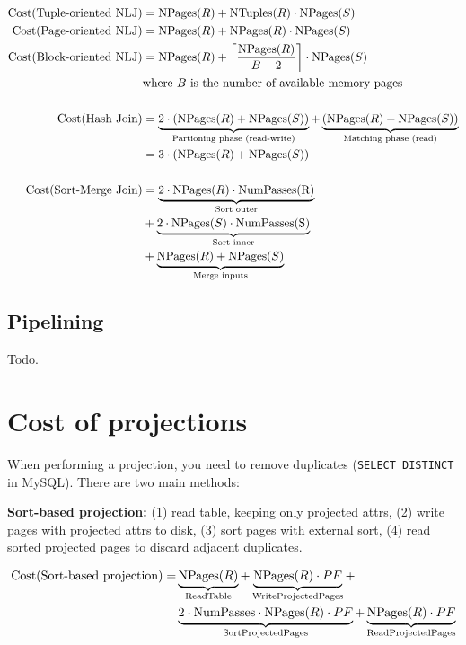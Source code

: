 \documentclass[10pt]{article}
\newcommand{\NPages}{\mathrm{NPages}}
\newcommand{\NTuples}{\mathrm{NTuples}}
\DeclarePairedDelimiter{\ceil}{\lceil}{\rceil}
\begin{document}
\begin{bluebox}
\begin{align*}
    \text{Cost(Tuple-oriented NLJ)} &= \NPages(R) + \NTuples(R) \cdot \NPages(S) \\
    \text{Cost(Page-oriented NLJ)} &= \NPages(R) + \NPages(R) \cdot \NPages(S) \\
    \text{Cost(Block-oriented NLJ)} &= \NPages(R) + \ceil*{\frac{\NPages(R)}{B - 2}} \cdot \NPages(S) \\
        &\text{where $B$ is the number of available memory pages} \\
        \; \\
    \text{Cost(Hash Join)} &= \underbrace{2 \cdot (\NPages(R) + \NPages(S))}_{\tiny \text{Partioning phase (read-write)}} + \underbrace{(\NPages(R) + \NPages(S))}_{\tiny \text{Matching phase (read)} }  \\
      &= 3 \cdot (\NPages(R) + \NPages(S))  \\
        \; \\
    \text{Cost(Sort-Merge Join)} &= \underbrace{2\cdot \NPages(R) \cdot \mathrm{NumPasses(R)}}_{\text{Sort outer}}\\
        &+ \underbrace{2 \cdot \NPages(S) \cdot \mathrm{NumPasses(S)}}_{\text{Sort inner}} \\
        &+ \underbrace{\NPages(R) + \NPages(S)}_{\text{Merge inputs}}
\end{align*}
\end{bluebox}

\subsection{Pipelining}

Todo.

\section{Cost of projections}

When performing a projection, you need to remove duplicates (\texttt{SELECT DISTINCT} in MySQL). There are two main methods:

\textbf{Sort-based projection: } (1) read table, keeping only projected attrs, (2) write pages with projected attrs to disk, (3) sort pages with external sort, (4) read sorted projected pages to discard adjacent duplicates.

\begin{greenbox}
\begin{align*}
\text{Cost(Sort-based projection)} = &\underbrace{\NPages(R)}_{\tiny \text{ReadTable}} + \underbrace{\NPages(R)\cdot PF}_{\tiny \text{WriteProjectedPages}} +\\
& \underbrace{2\cdot \text{NumPasses} \cdot \NPages(R) \cdot PF}_{ \text{SortProjectedPages}} + \underbrace{ \NPages(R) \cdot PF }_{ \text{ReadProjectedPages}} \\
\end{align*}
\end{greenbox}
\end{document}
